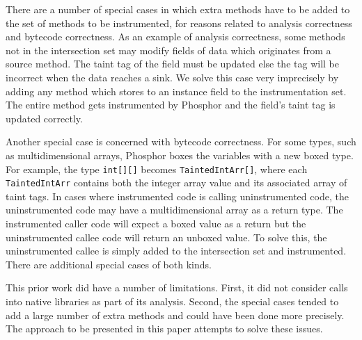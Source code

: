 There are a number of special cases in which extra methods have to be added to the set of methods to be instrumented, for reasons related to analysis correctness and bytecode correctness. As an example of analysis correctness, some methods not in the intersection set may modify fields of data which originates from a source method. The taint tag of the field must be updated else the tag will be incorrect when the data reaches a sink. We solve this case very imprecisely by adding any method which stores to an instance field to the instrumentation set. The entire method gets instrumented by Phosphor and the field's taint tag is updated correctly.

Another special case is concerned with bytecode correctness. For some types, such as multidimensional arrays, Phosphor boxes the variables with a new boxed type. For example, the type \texttt{int[][]} becomes \texttt{TaintedIntArr[]}, where each \texttt{TaintedIntArr} contains both the integer array value and its associated array of taint tags. In cases where instrumented code is calling uninstrumented code, the uninstrumented code may have a multidimensional array as a return type. The instrumented caller code will expect a boxed value as a return but the uninstrumented callee code will return an unboxed value. To solve this, the uninstrumented callee is simply added to the intersection set and instrumented. There are additional special cases of both kinds.

This prior work did have a number of limitations. First, it did not consider calls into native libraries as part of its analysis. Second, the special cases tended to add a large number of extra methods and could have been done more precisely. The approach to be presented in this paper attempts to solve these issues.

